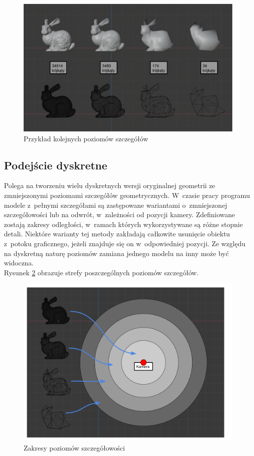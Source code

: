 \documentclass[a4paper,twoside,12pt]{book}
\begin{document}
\begin{figure}[H]
    \centering
    \includegraphics[width=\textwidth]{res/lod_example.png}
    \caption{Przykład kolejnych poziomów szczegółów}
    \label{fig:lod_example}
\end{figure}

\subsection{Podejście dyskretne}
Polega na tworzeniu wielu dyskretnych wersji oryginalnej geometrii ze zmniejszonymi poziomami szczegółów geometrycznych. W~czasie pracy programu modele z~pełnymi szczegółami są zastępowane wariantami o~zmniejszonej szczegółowości lub na odwrót, w~zależności od pozycji kamery. Zdefiniowane zostają zakresy odległości, w~ramach których wykorzystywane są różne stopnie detali. Niektóre warianty tej metody zakładają całkowite usunięcie obiektu z~potoku graficznego, jeżeli znajduje się on w~odpowiedniej pozycji. Ze względu na dyskretną naturę poziomów zamiana jednego modelu na inny może być widoczna. \cite{lod4} \cite{lod} \\
Rysunek \ref{fig:lod_discrete_ranges} obrazuje strefy poszczególnych poziomów szczegółów.

\begin{figure}[H]
    \centering
    \includegraphics[width=\textwidth]{res/lod_discrete_ranges.png}
    \caption{Zakresy poziomów szczegółowości}
    \label{fig:lod_discrete_ranges}
\end{figure}
\end{document}
